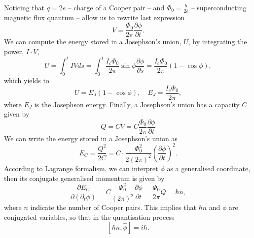 Noticing that $q=2e$ -- charge of a Cooper pair -- and $\Phi_{0} = \frac{h}{2e}$ -- superconducting magnetic flux quantum --  allow us to rewrite last expression
\begin{equation}
\tag{Second Joshepshon equation}
V = \frac{\Phi_{0}}{2\pi}\frac{\partial \phi}{\partial t}.
\end{equation}
We can compute the energy stored in a Josephson's union, $U$, by integrating the power, $I\cdot V$,
\begin{equation}
U = \int_{0}^{t}IVds = \int_{0}^{t}\frac{I_{c}\Phi_{0}}{2\pi}\sin{\phi}\frac{\partial \phi}{\partial s} = \frac{I_{c}\Phi_{0}}{2\pi}\left(1-\cos{\phi}\right),
\end{equation}
which yields to
\begin{equation}
\tag{Third Joshepshon equation}
U = E_{J}\left(1-\cos{\phi}\right), \quad E_{J} = \frac{I_{c}\Phi_{0}}{2\pi},
\end{equation}
where $E_{J}$ is the Josephson energy.
Finally, a Josephson's union has a capacity $C$ given by
\begin{equation}
\tag{Forth Joshepshon equation}
Q = CV = C \frac{\Phi_{0}}{2\pi}\frac{\partial \phi}{\partial t}
\end{equation}
We can write the energy stored in a Josephson's union as
\begin{equation}
E_{C} = \frac{Q^{2}}{2C} = C\cdot \frac{\Phi_{0}^{2}}{2\left(2\pi\right)^{2}}\left(\frac{\partial \phi}{\partial t}\right)^{2}.
\end{equation}
According to Lagrange formalism, we can interpret $\phi$ as a generalised coordinate, then its conjugate generalised momentum is given by
\begin{equation}
\frac{\partial E_{C}}{\partial \left(\partial_{t}\phi\right)} = C \frac{\Phi_{0}^{2}}{\left(2\pi\right)^{2}}\frac{\partial \phi}{\partial t} = \frac{\Phi_{0}}{2\pi}Q = \hbar n,
\end{equation}
where $n$ indicate the number of Cooper pairs. This implies that $\hbar n$ and $\phi$ are conjugated variables, so that in the quantisation process
\begin{equation}
\left[\hbar \hat{n},\hat{\phi}\right] = i\hbar.
\end{equation}
